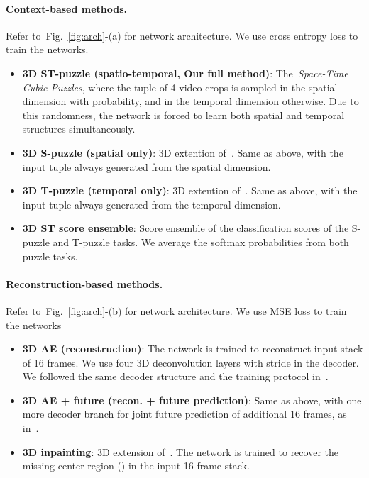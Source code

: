 \documentclass[letterpaper]{article} \usepackage{aaai19}  \usepackage{times}  \usepackage{helvet}  \usepackage{courier}  \usepackage{url}  \usepackage{graphicx}  \frenchspacing  \setlength{\pdfpagewidth}{8.5in}  \setlength{\pdfpageheight}{11in}
\newcommand{\figref}[1]{Fig.~\ref{#1}}
\begin{document}
\paragraph{Context-based methods.}
Refer to~\figref{fig:arch}-(a) for network architecture. We use cross entropy loss to train the networks.
\begin{itemize}
\item \textbf{3D ST-puzzle (spatio-temporal, Our full method)}: 
The~\textit{Space-Time Cubic Puzzles}, where the tuple of 4 video crops is sampled in the spatial dimension with  probability, and in the temporal dimension otherwise. Due to this randomness, the network is forced to learn both spatial and temporal structures simultaneously.
\item \textbf{3D S-puzzle (spatial only)}: 3D extention of~\cite{doersch2015unsupervised,noroozi2016unsupervised}. Same as above, with the input tuple always generated from the spatial dimension.
\item \textbf{3D T-puzzle (temporal only)}: 3D extention of~\cite{misra2016shuffle}. Same as above, with the input tuple always generated from the temporal dimension.
\item \textbf{3D ST score ensemble}: Score ensemble of the classification scores of the S-puzzle and T-puzzle tasks. We average the softmax probabilities from both puzzle tasks.
\end{itemize}



\paragraph{Reconstruction-based methods.}
Refer to~\figref{fig:arch}-(b) for network architecture. We use MSE loss to train the networks
\begin{itemize}
\item \textbf{3D AE (reconstruction)}: 
The network is trained to reconstruct input stack of 16 frames. We use four 3D deconvolution layers with stride  in the decoder. We followed the same decoder structure and the training protocol in~\cite{zhao2017spatio}.
\item \textbf{3D AE + future (recon. + future prediction)}: Same as above, with one more decoder branch for joint future prediction of additional 16 frames, as in~\cite{zhao2017spatio}.
\item \textbf{3D inpainting}: 3D extension of~\cite{Pathak2016inpainting}. The network is trained to recover the missing center region () in the input 16-frame stack.
\end{itemize}
\end{document}
